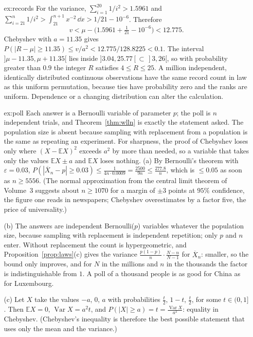 \begin{solution}{ex:records}
For the variance, $\sum_{i=1}^{20}1/i^2>1.5961$ and $\sum_{i=21}^n 1/i^2>\int_{21}^{n+1}x^{-2}\,\dd x>1/21-10^{-6}$. Therefore
\[
v<\mu-\bigl(1.5961+\tfrac1{21}-10^{-6}\bigr)<12.775.
\]
Chebyshev with $a=11.35$ gives $P(|R-\mu|\ge11.35)\le v/a^2<12.775/128.8225<0.1$. The interval $]\mu-11.35,\mu+11.35[$ lies inside $]3.04,25.77[\subset\,]3,26[$, so with probability greater than $0.9$ the integer $R$ satisfies $4\le R\le25$.
A million independent, identically distributed continuous observations have the same record count in law as this uniform permutation, because ties have probability zero and the ranks are uniform. Dependence or a changing distribution can alter the calculation.
\end{solution}

\begin{solution}{ex:poll}
\idea Each answer is a Bernoulli variable of parameter $p$; the poll is $n$ independent trials, and Theorem~\ref{thm:wlln} is exactly the statement asked. The population size is absent because sampling with replacement from a population is the same as repeating an experiment. For sharpness, the proof of Chebyshev loses only where $(X-\mathbb EX)^2$ exceeds $a^2$ by more than needed, so a variable that takes only the values $\mathbb EX\pm a$ and $\mathbb EX$ loses nothing.
\writeup (a) By Bernoulli's theorem with $\varepsilon=0.03$, $P(|\overline X_n-p|\ge0.03)\le\frac1{4n\cdot0.0009}=\frac{2500}{9n}\le\frac{277.8}n$, which is $\le0.05$ as soon as $n\ge5556$. (The normal approximation from the central limit theorem of Volume~3 suggests about $n\ge1070$ for a margin of $\pm3$ points at $95\%$ confidence, the figure one reads in newspapers; Chebyshev overestimates by a factor five, the price of universality.)

(b) The answers are independent Bernoulli($p$) variables whatever the population size, because sampling with replacement is independent repetition; only $p$ and $n$ enter. Without replacement the count is hypergeometric, and Proposition~\ref{prop:laws}(c) gives the variance $\frac{p(1-p)}n\cdot\frac{N-n}{N-1}$ for $\overline X_n$: smaller, so the bound only improves, and for $N$ in the millions and $n$ in the thousands the factor is indistinguishable from $1$. A poll of a thousand people is as good for China as for Luxembourg.

(c) Let $X$ take the values $-a$, $0$, $a$ with probabilities $\frac t2$, $1-t$, $\frac t2$, for some $t\in(0,1]$. Then $\mathbb EX=0$, $\operatorname{Var}X=a^2t$, and $P(|X|\ge a)=t=\frac{\operatorname{Var}X}{a^2}$: equality in Chebyshev. (Chebyshev's inequality is therefore the best possible statement that uses only the mean and the variance.)
\end{solution}

